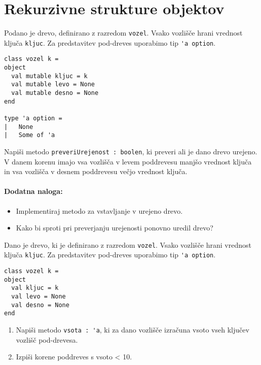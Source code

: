\section{Rekurzivne strukture objektov}


\begin{ex}
Podano je drevo, definirano z razredom \lstinline{vozel}. Vsako vozli\v s\v ce hrani vrednost klju\v ca \lstinline{kljuc}. Za predstavitev pod-dreves uporabimo tip \lstinline{'a option}.
\begin{lstlisting}
class vozel k = 
object
  val mutable kljuc = k
  val mutable levo = None
  val mutable desno = None
end

type 'a option = 
|	None
|	Some of 'a

\end{lstlisting}

Napi\v si metodo \lstinline{preveriUrejenost : boolen}, ki preveri ali je dano drevo urejeno. V danem korenu imajo vsa vozli\v s\v ca v levem poddrevesu manj\v so vrednost klju\v ca in vsa vozli\v s\v ca v desnem poddrevesu ve\v cjo vrednost klju\v ca.

\paragraph{Dodatna naloga:} 
\begin{itemize}
    \item Implementiraj metodo za vstavljanje v urejeno drevo.
    \item Kako bi sproti pri preverjanju urejenosti ponovno uredil drevo?
\end{itemize}

\end{ex}






\begin{ex}
Dano je drevo, ki je definirano z razredom \lstinline{vozel}. Vsako vozli\v s\v ce hrani vrednost klju\v ca \lstinline{kljuc}. Za predstavitev pod-dreves uporabimo tip \lstinline{'a option}.
\begin{lstlisting}
class vozel k = 
object
  val kljuc = k
  val levo = None
  val desno = None
end
\end{lstlisting}

\begin{enumerate}
\item Napi\v si metodo \lstinline{vsota : 'a}, ki za dano vozli\v s\v ce izra\v cuna vsoto vseh klju\v cev vozli\v s\v c pod-drevesa.

\item Izpi\v si korene poddreves s vsoto < 10.
\end{enumerate}
\end{ex}






